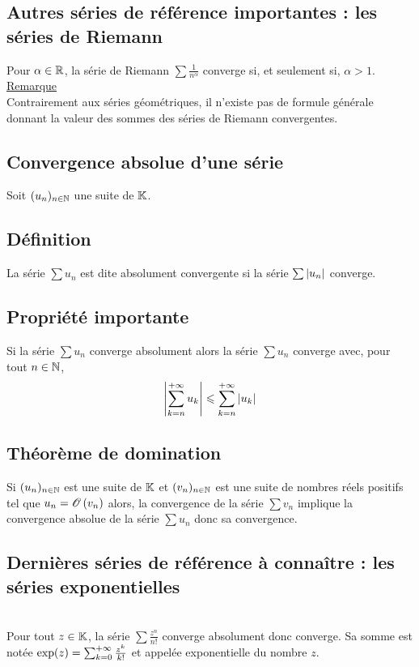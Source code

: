 \subsection{Autres séries de référence importantes : les séries de Riemann}
\begin{defprop}
   Pour \(\alpha  \in  \mathbb{R}\), la série de Riemann \(\sum \frac{1}{n^{\alpha}}\)  converge si, et seulement si, \(\alpha  > 1\).\\
    \underline{Remarque}\\
    Contrairement aux séries géométriques, il n’existe pas de formule générale donnant la valeur des sommes des séries de Riemann convergentes. 
\end{defprop}

\subsection{Convergence absolue d’une série}
    Soit \((u_n)_{n\in \mathbb{N} }\) une suite de \(\mathbb{K}\).
\subsection{Définition}
\begin{defi}
    La série \(\sum u_n \) est dite absolument convergente si la série  \(\sum \left\lvert u_n\right\rvert\) converge.
\end{defi}
\subsection{Propriété importante}
\begin{defprop}
    Si la série \(\sum u_n \) converge absolument alors la série \(\sum u_n \) converge avec, pour tout \(n \in  \mathbb{N}\),
    \[\left\lvert\sum^{+\infty}_{k=n}u_k\right\rvert \leqslant\sum^{+\infty}_{k=n}\left\lvert u_k\right\rvert\]
\end{defprop}

\subsection{Théorème de domination}
\begin{theo}
    Si \((u_n)_{n\in \mathbb{N} }\) est une suite de \(\mathbb{K}\) et \((v_n)_{n\in \mathbb{N}}\) est une suite de nombres réels positifs tel que \(u_n = \mathscr{O}\left(v_n\right)\) alors, la convergence de la série \(\sum v_n\) implique la convergence absolue de la série \(\sum u_n\) donc sa convergence.
\end{theo}
\subsection{Dernières séries de référence à connaître : les séries exponentielles}
\begin{defprop}
    ~\\
    Pour tout \(z \in  \mathbb{K}\), la série \(\sum \frac{z^n}{n!}\) converge absolument donc converge. Sa somme est notée \(\exp(z) = \sum^{+\infty}_{k=0} \frac{z^k}{k!}\) et appelée exponentielle du nombre \(z\).
\end{defprop}
